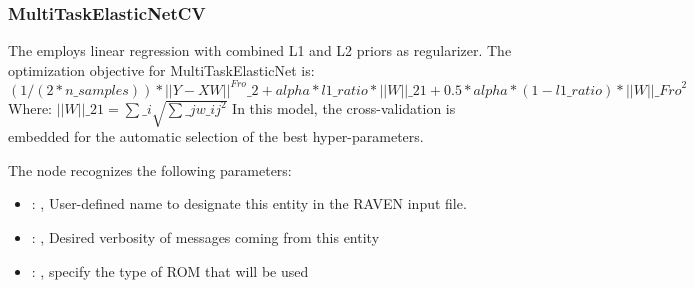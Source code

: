 \subsubsection{MultiTaskElasticNetCV}
  The  employs                         linear regression with
  combined L1 and L2 priors as regularizer.                         The optimization objective for
  MultiTaskElasticNet is:                         $(1 / (2 * n\_samples)) * ||Y - XW||^{Fro}\_2
  + alpha * l1\_ratio * ||W||\_{21}                         + 0.5 * alpha * (1 - l1\_ratio) *
  ||W||\_{Fro}^2$                         \\Where:                         $||W||\_{21} = \sum\_i
  \sqrt{\sum\_j w\_{ij}^2}$                         In this model, the cross-validation is embedded
  for the automatic selection                         of the best hyper-parameters.

  The  node recognizes the following parameters:
    \begin{itemize}
      \item {}: , 
        User-defined name to designate this entity in the RAVEN input file.
      \item {}: , 
        Desired verbosity of messages coming from this entity
      \item {}: , 
        specify the type of ROM that will be used
  \end{itemize}

